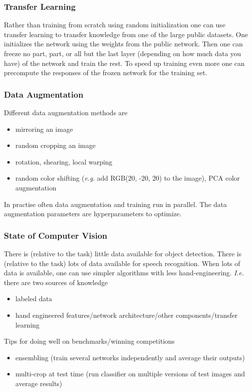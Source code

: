 \documentclass{article}
\begin{document}
\subsubsection{Transfer Learning}
Rather than training from scratch using random initialization
one can use transfer learning to transfer knowledge from one of the large public datasets.
One initializes the network using the weights from the public network.
Then one can freeze no part, part, or all but the last layer (depending on how much data you have) of the network and train the rest.
To speed up training even more one can precompute the responses of the frozen network for the training set.

\subsubsection{Data Augmentation}
Different data augmentation methods are
\begin{itemize}
  \item mirroring an image
  \item random cropping an image
  \item rotation, shearing, local warping
  \item random color shifting (\emph{e.g.} add RGB(20, -20, 20) to the image), PCA color augmentation
\end{itemize}
In practise often data augmentation and training run in parallel.
The data augmentation parameters are hyperparameters to optimize.

\subsubsection{State of Computer Vision}
There is (relative to the task) little data available for object detection.
There is (relative to the task) lots of data available for speech recognition.
When lots of data is available, one can use simpler algorithms with less hand-engineering.
\emph{I.e.} there are two sources of knowledge
\begin{itemize}
  \item labeled data
  \item hand engineered features/network architecture/other components/transfer learning
\end{itemize}
Tips for doing well on benchmarks/winning competitions
\begin{itemize}
  \item ensembling (train several networks independently and average their outputs)
  \item multi-crop at test time (run classifier on multiple versions of test images and average results)
\end{itemize}
\end{document}
